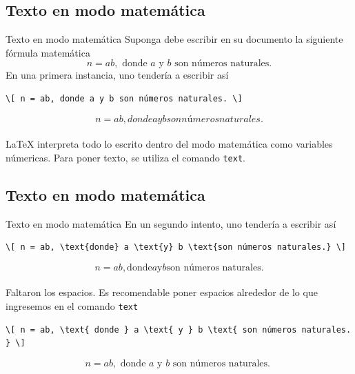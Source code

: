 \documentclass[../slides.tex]{subfiles}
\begin{document}
    \subsection{Texto en modo matemática}
    
    \begin{frame}[fragile]{Texto en modo matemática}
        Suponga debe escribir en su documento la siguiente fórmula matemática
\[ n = ab, \text{ donde } a \text{ y } b \text{ son números naturales.} \]
        \pause
        En una primera instancia, uno tendería a escribir así
            \begin{verbatim}
\[ n = ab, donde a y b son números naturales. \]
            \end{verbatim}
        \pause
        \[ n = ab, donde a y b son números naturales. \]\\[\baselineskip]
        
    \LaTeX{} interpreta todo lo escrito dentro del modo matemática como variables númericas. Para poner texto, se utiliza el comando \texttt{text}.
    \end{frame}
    
    \subsection{Texto en modo matemática}
    
    \begin{frame}[fragile]{Texto en modo matemática}
        En un segundo intento, uno tendería a escribir así
        {\footnotesize{
            \begin{verbatim}
\[ n = ab, \text{donde} a \text{y} b \text{son números naturales.} \]
            \end{verbatim}
        }}
        \pause
        \[ n = ab, \text{donde} a \text{y} b \text{son números naturales.} \]\\[\baselineskip]
        
    Faltaron los espacios. Es recomendable poner espacios alrededor de lo que ingresemos en el comando \texttt{text}
    \pause
        {\footnotesize{
            \begin{verbatim}
\[ n = ab, \text{ donde } a \text{ y } b \text{ son números naturales. } \]
            \end{verbatim}
        }}
        \[ n = ab, \text{ donde } a \text{ y } b \text{ son números naturales. } \]\\[\baselineskip]
    \end{frame}
    
\end{document}
